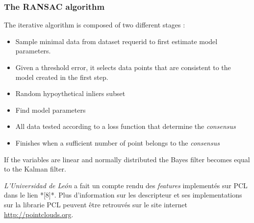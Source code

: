 \subsubsection{The RANSAC algorithm}

The iterative algorithm is composed of two different stages : 
\begin {itemize}
  \item Sample minimal data from dataset requerid to first estimate model parameters.
  \item Given a threshold error, it selects data points that are consistent to the model created in the first step.
\end {itemize}

\begin{itemize}
  \item Random hypoythetical inliers subset
  \item Find model parameters
  \item All data tested according to a loss function that determine the \textit{consensus}
  \item Finishes when a sufficient number of point belongs to the \textit{consensus}
\end{itemize}

\center \large{\color{blue} If the variables are linear and normally distributed the Bayes filter becomes equal to the Kalman filter.}



\textit{L'Universidad de León } a fait un compte rendu des
\textit{features} implementés sur PCL dans le lien *[8]*. Plus
d'information sur les descripteur et ses implementations sur la
librarie PCL peuvent être retrouvés sur le site
internet \url{http://pointclouds.org}.

